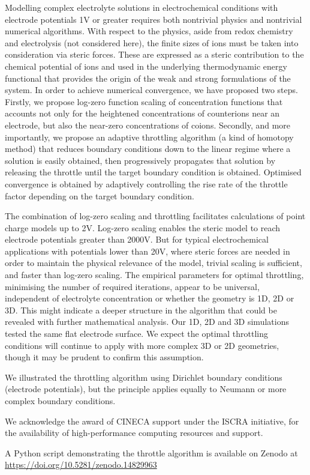 Modelling complex electrolyte solutions in electrochemical conditions
with electrode potentials 1V or greater requires both nontrivial
physics and nontrivial numerical algorithms.
With respect to the
physics, aside from redox chemistry and electrolysis (not considered
here), the finite sizes of ions must be taken into consideration via
steric forces. These are expressed as a steric contribution to the
chemical potential of ions and used in the underlying thermodynamic
energy functional that provides the origin of the weak and strong
formulations of the system.
In order to achieve numerical convergence, we have proposed two
steps. Firstly, we propose log-zero function scaling of
concentration functions that accounts
not only for the heightened concentrations of counterions near an
electrode, but also the near-zero concentrations of coions. Secondly,
and more importantly, we propose an adaptive throttling algorithm (a kind of homotopy
method) that reduces boundary conditions 
down to the linear regime where a solution is easily obtained, then
progressively propagates that solution by releasing the throttle
until the target boundary condition is obtained. Optimised convergence
is obtained by adaptively controlling the rise rate of the throttle factor
depending on the target boundary condition.

The combination of
log-zero scaling and throttling facilitates calculations of point
charge models up to 2V. Log-zero scaling enables
the steric model to reach electrode potentials greater than 2000V.
But for typical electrochemical applications with potentials lower than 20V,
where steric forces are needed in order to maintain the physical relevance
of the model, trivial scaling is sufficient, and faster than log-zero scaling.
The empirical parameters for optimal throttling, minimising the number of
required iterations, appear to be universal, independent of
electrolyte concentration or whether the geometry is 1D, 2D or 3D.
This might indicate a deeper structure in the algorithm that could be
revealed with further mathematical analysis. Our 1D, 2D and 3D
simulations tested the same flat electrode surface. We expect the optimal throttling
conditions will continue to apply with more complex 3D or 2D
geometries, though it may be prudent to confirm this assumption.

We illustrated the throttling algorithm using Dirichlet boundary
conditions (electrode potentials), but the  principle applies
equally to Neumann or more complex boundary conditions.

\begin{acknowledgement}
  We acknowledge the award of CINECA support under the ISCRA
  initiative, for the availability of high-performance computing
  resources and support.

  A Python script demonstrating the throttle algorithm is available on Zenodo at
\\  \url{https://doi.org/10.5281/zenodo.14829963}

\end{acknowledgement}





